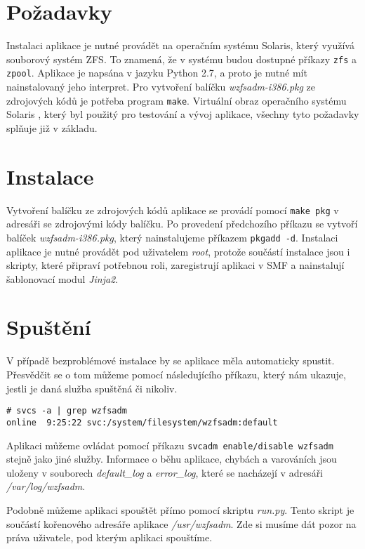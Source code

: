 \section{Požadavky}
Instalaci aplikace je nutné provádět na operačním systému Solaris, který využívá souborový systém ZFS. To znamená, že v systému budou dostupné příkazy \verb|zfs| a \verb|zpool|. Aplikace je napsána v jazyku Python 2.7, a proto je nutné mít nainstalovaný jeho interpret. Pro vytvoření balíčku \emph{wzfsadm-i386.pkg} ze zdrojových kódů je potřeba program \verb|make|. Virtuální obraz operačního systému Solaris \cite{vb}, který byl použitý pro testování a vývoj aplikace, všechny tyto požadavky splňuje již v základu.
\section{Instalace}
Vytvoření balíčku ze zdrojových kódů aplikace se provádí pomocí \verb|make pkg| v adresáři se zdrojovými kódy balíčku. Po provedení předchozího příkazu se vytvoří balíček \emph{wzfsadm-i386.pkg}, který nainstalujeme příkazem \verb|pkgadd -d|. Instalaci aplikace je nutné provádět pod uživatelem \emph{root}, protože součástí instalace jsou i skripty, které připraví potřebnou roli, zaregistrují aplikaci v SMF a nainstalují šablonovací modul \emph{Jinja2}.
\section{Spuštění}
V případě bezproblémové instalace by se aplikace měla automaticky spustit. Přesvědčit se o tom můžeme pomocí následujícího příkazu, který nám ukazuje, jestli je daná služba spuštěná či nikoliv.
\begin{verbatim}
# svcs -a | grep wzfsadm
online  9:25:22 svc:/system/filesystem/wzfsadm:default
\end{verbatim}
Aplikaci můžeme ovládat pomocí příkazu \verb|svcadm enable/disable wzfsadm| stejně jako jiné služby. Informace o běhu aplikace, chybách a varováních jsou uloženy v souborech \emph{default\_log} a \emph{error\_log}, které se nacházejí v adresáři \emph{/var/log/wzfsadm}.

Podobně můžeme aplikaci spouštět přímo pomocí skriptu \emph{run.py}. Tento skript je součástí kořenového adresáře aplikace \emph{/usr/wzfsadm}. Zde si musíme dát pozor na práva uživatele, pod kterým aplikaci spouštíme.

